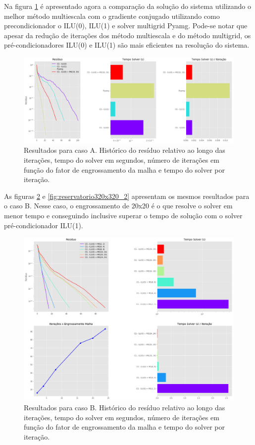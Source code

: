 Na figura \ref{fig:reservatorio100x100_2} é apresentado agora a comparação da solução do sistema utilizando o melhor método multiescala com o gradiente conjugado utilizando como precondicionador o ILU(0), ILU(1) e solver multigrid Pyamg. Pode-se notar que apesar da redução de iterações dos método multiescala e do método multigrid, os pré-condicionadores ILU(0) e ILU(1) são mais eficientes na resolução do sistema. 


\begin{figure}[!htbp]
\label{fig:reservatorio100x100_2}
\centering
\includegraphics[width=\textwidth]{chap08/figs/reservatorio100x100_2.png}
\caption{Resultados para caso A. Histórico do resíduo relativo ao longo das iterações, tempo do solver em segundos, número de iterações em função do fator de engrossamento da malha e tempo do solver por iteração. }
\end{figure}


As figuras \ref{fig:reservatorio320x320_1} e \ref{fig:reservatorio320x320_2} apresentam os mesmos resultados para o caso B. Nesse caso, o engrossamento de 20x20 é o que resolve o solver em menor tempo e conseguindo inclusive superar o tempo de solução com o solver pré-condicionador ILU(1).


\begin{figure}[!htbp]
\label{fig:reservatorio320x320_1}
\centering
\includegraphics[width=\textwidth]{chap08/figs/reservatorio320x320_1.png}
\caption{Resultados para caso B. Histórico do resíduo relativo ao longo das iterações, tempo do solver em segundos, número de iterações em função do fator de engrossamento da malha e tempo do solver por iteração. }
\end{figure}


